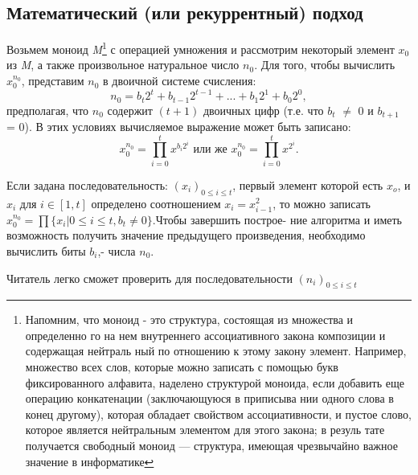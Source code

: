 \subsection{ Математический (или рекуррентный) подход}
Возьмем моноид \textit{M}\footnote{ Напомним, что моноид - это структура, состоящая из множества и определенно­
го на нем внутреннего ассоциативного закона композиции и содержащая нейтраль­
ный по отношению к этому закону элемент. Например, множество всех слов, которые
можно записать с  помощью букв фиксированного алфавита, наделено структурой
моноида, если добавить еще операцию конкатенации (заключающуюся в приписыва­
нии одного слова в конец другому), которая обладает свойством ассоциативности, и
пустое слово, которое является нейтральным элементом для этого закона; в резуль­
тате  получается  свободный  моноид  —  структура, имеющая  чрезвычайно  важное
значение в информатике} с операцией умножения и рассмотрим некоторый 
элемент $x_0$ из \textit{M}, а также произвольное натуральное число $n_{0}$. Для того, 
чтобы вычислить $x_{0}^{n_{0}}$, представим $n_{0}$ в двоичной системе счисления:
\begin{equation*}
n_{0} = b_{t}2^{t} + b_{t - 1}2^{t - 1} + ... + b_{1}2^{1} + b_{0}2^{0},
\end{equation*}
предполагая, что $n_{0}$ содержит \textit{$(t + 1)$} двоичных цифр (т.е. что $b_{t}$ $\neq$ 0 и  \linebreak
$b_{t + 1}$ = 0). В этих условиях вычисляемое выражение может быть запи­сано:
\begin{equation*}
x_{0}^{n_{0}} = \prod_{i=0}^t x^{b_{i}2^{i}} \text{  или же  } x_{0}^{n_{0}} = \prod_{i=0}^t x^{2^{i}}.
\end{equation*}

Если задана последовательность: $(x_{i})_{0 \leqslant i \leqslant t}$, первый  элемент  которой 
\linebreak
есть $x_{o}$, и $x_{i}$ для \textit{$i \in [1,t]$} определено соотношением \textit{$x_{i} = x_{i-1}^2$}, то можно\linebreak
записать $x_{0}^{n_{0}} = \prod \{ x_{i} | 0 \leqslant i \leqslant t, b_{t} \neq 0\}$.Чтобы завершить построе-\linebreak
ние алгоритма и иметь возможность получить значение предыдущего\linebreak
произведения, необходимо вычислить биты $b_{i}$,- числа $n_{0}$.

Читатель легко сможет проверить для последовательности $(n_{i})_{0 \leqslant i \leqslant t}$ 

